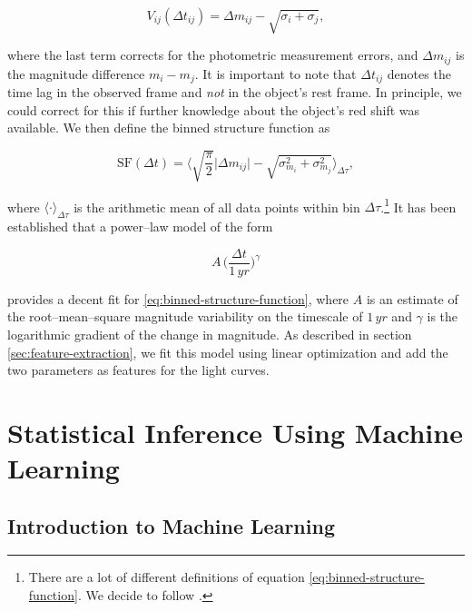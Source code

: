 \begin{equation}
V_{ij}(\Delta t_{ij}) = \Delta m_{ij} - \sqrt{\sigma_i + \sigma_j},
\end{equation}

where the last term corrects for the photometric measurement errors, and $\Delta m_{ij}$ is the magnitude difference $m_i - m_j$. It is important to note that $\Delta t_{ij}$ denotes the time lag in the observed frame and \emph{not} in the object's rest frame. In principle, we could correct for this if further knowledge about the object's red shift was available. We then define the binned structure function as

\begin{equation}
\text{SF}(\Delta t) = \big\langle \sqrt{\frac{\pi}{2}} \big| \Delta m_{ij}  \big| - \sqrt{\sigma_{m_i}^2 + \sigma_{m_j}^2} \big\rangle_{\Delta \tau},
\label{eq:binned-structure-function}
\end{equation}

where $\langle \cdot \rangle_{\Delta \tau}$ is the arithmetic mean of all data points within bin $\Delta \tau$.\footnote{There are a lot of different definitions of equation \eqref{eq:binned-structure-function}. We decide to follow \citet{schmidt2010}.} It has been established \citep{richards2006} that a power--law model of the form

\begin{equation}
A \, \big(\frac{\Delta t}{1 \, \unit{yr}}\big)^\gamma
\end{equation}

provides a decent fit for \eqref{eq:binned-structure-function}, where $A$ is an estimate of the root--mean--square magnitude variability on the timescale of $1 \, \unit{yr}$ and $\gamma$ is the logarithmic gradient of the change in magnitude. As described in section \ref{sec:feature-extraction}, we fit this model using linear optimization and add the two parameters as features for the light curves.

\section{Statistical Inference Using Machine Learning}

\subsection{Introduction to Machine Learning}
\label{sec:introduction-machine-learning}

